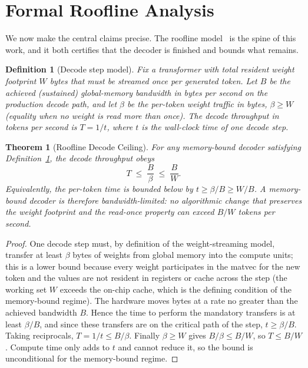 \documentclass[11pt]{article}
\newtheorem{theorem}{Theorem}
\newtheorem{definition}{Definition}
\begin{document}
\section{Formal Roofline Analysis}
\label{sec:roofline}

We now make the central claims precise. The roofline model~\cite{williams2009} is the spine of this work, and it both certifies that the decoder is finished and bounds what remains.

\begin{definition}[Decode step model]
\label{def:decode}
Fix a transformer with total resident weight footprint $W$ bytes that must be streamed once per generated token. Let $B$ be the achieved (sustained) global-memory bandwidth in bytes per second on the production decode path, and let $\beta$ be the per-token weight traffic in bytes, $\beta \geq W$ (equality when no weight is read more than once). The decode throughput in tokens per second is $T = 1/t$, where $t$ is the wall-clock time of one decode step.
\end{definition}

\begin{theorem}[Roofline Decode Ceiling]
\label{thm:roofline}
For any memory-bound decoder satisfying Definition~\ref{def:decode}, the decode throughput obeys
\[
T \;\leq\; \frac{B}{\beta} \;\leq\; \frac{B}{W}.
\]
Equivalently, the per-token time is bounded below by $t \geq \beta / B \geq W/B$. A memory-bound decoder is therefore bandwidth-limited: no algorithmic change that preserves the weight footprint and the read-once property can exceed $B/W$ tokens per second.
\end{theorem}

\begin{proof}
One decode step must, by definition of the weight-streaming model, transfer at least $\beta$ bytes of weights from global memory into the compute units; this is a lower bound because every weight participates in the matvec for the new token and the values are not resident in registers or cache across the step (the working set $W$ exceeds the on-chip cache, which is the defining condition of the memory-bound regime). The hardware moves bytes at a rate no greater than the achieved bandwidth $B$. Hence the time to perform the mandatory transfers is at least $\beta/B$, and since these transfers are on the critical path of the step, $t \geq \beta/B$. Taking reciprocals, $T = 1/t \leq B/\beta$. Finally $\beta \geq W$ gives $B/\beta \leq B/W$, so $T \leq B/W$. Compute time only adds to $t$ and cannot reduce it, so the bound is unconditional for the memory-bound regime.
\end{proof}
\end{document}
